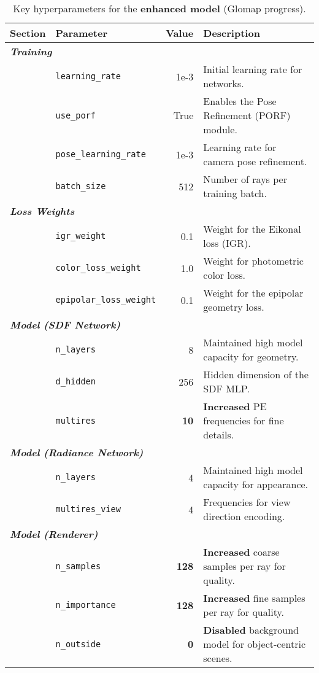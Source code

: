 \documentclass{article}
\begin{document}
\begin{table}[h!]
    \centering
    \captionsetup{justification=centering}
    \caption{Key hyperparameters for the \textbf{enhanced model} (Glomap progress).}
    \label{tab:hyperparams_enhanced}
    \begin{tabular}{llrl}
        \toprule
        \textbf{Section} & \textbf{Parameter} & \textbf{Value} & \textbf{Description} \\
        \midrule
        \multicolumn{4}{l}{\textit{\textbf{Training}}} \\
        & \texttt{learning\_rate} & 1e-3 & Initial learning rate for networks. \\
        & \texttt{use\_porf} & True & Enables the Pose Refinement (PORF) module. \\
        & \texttt{pose\_learning\_rate} & 1e-3 & Learning rate for camera pose refinement. \\
        & \texttt{batch\_size} & 512 & Number of rays per training batch. \\
        \midrule
        \multicolumn{4}{l}{\textit{\textbf{Loss Weights}}} \\
        & \texttt{igr\_weight} & 0.1 & Weight for the Eikonal loss (IGR). \\
        & \texttt{color\_loss\_weight} & 1.0 & Weight for photometric color loss. \\
        & \texttt{epipolar\_loss\_weight} & 0.1 & Weight for the epipolar geometry loss. \\
        \midrule
        \multicolumn{4}{l}{\textit{\textbf{Model (SDF Network)}}} \\
        & \texttt{n\_layers} & 8 & Maintained high model capacity for geometry. \\
        & \texttt{d\_hidden} & 256 & Hidden dimension of the SDF MLP. \\
        & \texttt{multires} & \textbf{10} & \textbf{Increased} PE frequencies for fine details. \\
        \midrule
        \multicolumn{4}{l}{\textit{\textbf{Model (Radiance Network)}}} \\
        & \texttt{n\_layers} & 4 & Maintained high model capacity for appearance. \\
        & \texttt{multires\_view} & 4 & Frequencies for view direction encoding. \\
        \midrule
        \multicolumn{4}{l}{\textit{\textbf{Model (Renderer)}}} \\
        & \texttt{n\_samples} & \textbf{128} & \textbf{Increased} coarse samples per ray for quality. \\
        & \texttt{n\_importance} & \textbf{128} & \textbf{Increased} fine samples per ray for quality. \\
        & \texttt{n\_outside} & \textbf{0} & \textbf{Disabled} background model for object-centric scenes. \\
        \bottomrule
    \end{tabular}
\end{table}
\end{document}
